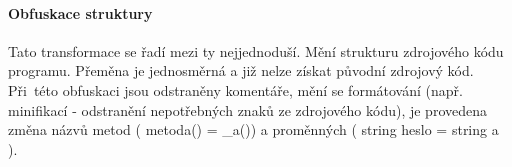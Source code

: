 \paragraph*{Obfuskace struktury}
Tato transformace se řadí mezi ty nejjednoduší. Mění strukturu zdrojového kódu programu. Přeměna je jednosměrná a již nelze získat původní zdrojový kód. Při~této obfuskaci jsou odstraněny komentáře, mění se formátování (např. minifikací - odstranění nepotřebných znaků ze zdrojového kódu), je provedena změna názvů metod ( metoda() = \_a()) a proměnných ( string heslo = string a ).

